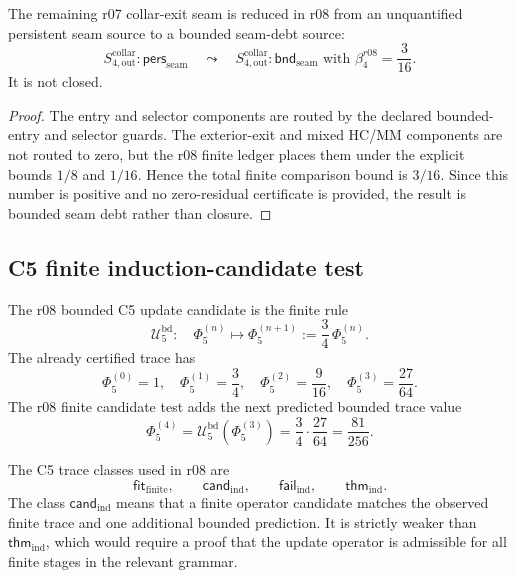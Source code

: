\begin{lemma}
\label{lem:v470-r08-collar-seam-bounded-not-closed}
The remaining r07 collar-exit seam is reduced in r08 from an unquantified
persistent seam source to a bounded seam-debt source:
\[
S_{4,\mathrm{out}}^{\mathrm{collar}}:
\mathsf{pers}_{\mathrm{seam}}
\quad\leadsto\quad
S_{4,\mathrm{out}}^{\mathrm{collar}}:
\mathsf{bnd}_{\mathrm{seam}}
\text{ with }\beta_4^{r08}=\frac3{16}.
\]
It is not closed.
\end{lemma}

\begin{proof}
The entry and selector components are routed by the declared bounded-entry and
selector guards.  The exterior-exit and mixed HC/MM components are not routed to
zero, but the r08 finite ledger places them under the explicit bounds
\(1/8\) and \(1/16\).  Hence the total finite comparison bound is
\(3/16\).  Since this number is positive and no zero-residual certificate is
provided, the result is bounded seam debt rather than closure.
\end{proof}

\subsection{C5 finite induction-candidate test}
\label{subsec:v470-r08-c5-induction-candidate}

\begin{definition}
\label{def:v470-r08-c5-update-candidate}
The r08 bounded C5 update candidate is the finite rule
\[
\mathcal U_5^{\mathrm{bd}}:\quad
\Phi_5^{(n)}\longmapsto \Phi_5^{(n+1)}
:=\frac34\,\Phi_5^{(n)}.
\]
The already certified trace has
\[
\Phi_5^{(0)}=1,
\quad
\Phi_5^{(1)}=\frac34,
\quad
\Phi_5^{(2)}=\frac9{16},
\quad
\Phi_5^{(3)}=\frac{27}{64}.
\]
The r08 finite candidate test adds the next predicted bounded trace value
\[
\Phi_5^{(4)}
=
\mathcal U_5^{\mathrm{bd}}(\Phi_5^{(3)})
=
\frac34\cdot\frac{27}{64}
=
\frac{81}{256}.
\]
\end{definition}

\begin{definition}
\label{def:v470-r08-c5-induction-candidate-classes}
The C5 trace classes used in r08 are
\[
\mathsf{fit}_{\mathrm{finite}},\qquad
\mathsf{cand}_{\mathrm{ind}},\qquad
\mathsf{fail}_{\mathrm{ind}},\qquad
\mathsf{thm}_{\mathrm{ind}}.
\]
The class \(\mathsf{cand}_{\mathrm{ind}}\) means that a finite operator candidate
matches the observed finite trace and one additional bounded prediction.  It is
strictly weaker than \(\mathsf{thm}_{\mathrm{ind}}\), which would require a
proof that the update operator is admissible for all finite stages in the
relevant grammar.
\end{definition}

